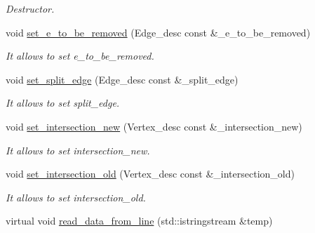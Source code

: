 \begin{DoxyCompactItemize}
\begin{DoxyCompactList}\small\item\em Destructor. \item\end{DoxyCompactList}\item 
\hypertarget{classfinal_a8f6841bfff9cfdc1127b8290a1ef1085}{
void \hyperlink{classfinal_a8f6841bfff9cfdc1127b8290a1ef1085}{set\_\-e\_\-to\_\-be\_\-removed} (Edge\_\-desc const \&\_\-e\_\-to\_\-be\_\-removed)}
\label{classfinal_a8f6841bfff9cfdc1127b8290a1ef1085}

\begin{DoxyCompactList}\small\item\em It allows to set e\_\-to\_\-be\_\-removed. \item\end{DoxyCompactList}\item 
\hypertarget{classfinal_aa61075494cf1aea32b10f216fb9093fc}{
void \hyperlink{classfinal_aa61075494cf1aea32b10f216fb9093fc}{set\_\-split\_\-edge} (Edge\_\-desc const \&\_\-split\_\-edge)}
\label{classfinal_aa61075494cf1aea32b10f216fb9093fc}

\begin{DoxyCompactList}\small\item\em It allows to set split\_\-edge. \item\end{DoxyCompactList}\item 
\hypertarget{classfinal_a0312312e30a4b59f9e1c861539f266ec}{
void \hyperlink{classfinal_a0312312e30a4b59f9e1c861539f266ec}{set\_\-intersection\_\-new} (Vertex\_\-desc const \&\_\-intersection\_\-new)}
\label{classfinal_a0312312e30a4b59f9e1c861539f266ec}

\begin{DoxyCompactList}\small\item\em It allows to set intersection\_\-new. \item\end{DoxyCompactList}\item 
\hypertarget{classfinal_a0085254883aa39b135d51794d75d3ee2}{
void \hyperlink{classfinal_a0085254883aa39b135d51794d75d3ee2}{set\_\-intersection\_\-old} (Vertex\_\-desc const \&\_\-intersection\_\-old)}
\label{classfinal_a0085254883aa39b135d51794d75d3ee2}

\begin{DoxyCompactList}\small\item\em It allows to set intersection\_\-old. \item\end{DoxyCompactList}\item 
\hypertarget{classfinal_a1a4095a2c11236175b4e29557704554c}{
virtual void \hyperlink{classfinal_a1a4095a2c11236175b4e29557704554c}{read\_\-data\_\-from\_\-line} (std::istringstream \&temp)}
\label{classfinal_a1a4095a2c11236175b4e29557704554c}


\end{DoxyCompactItemize}
